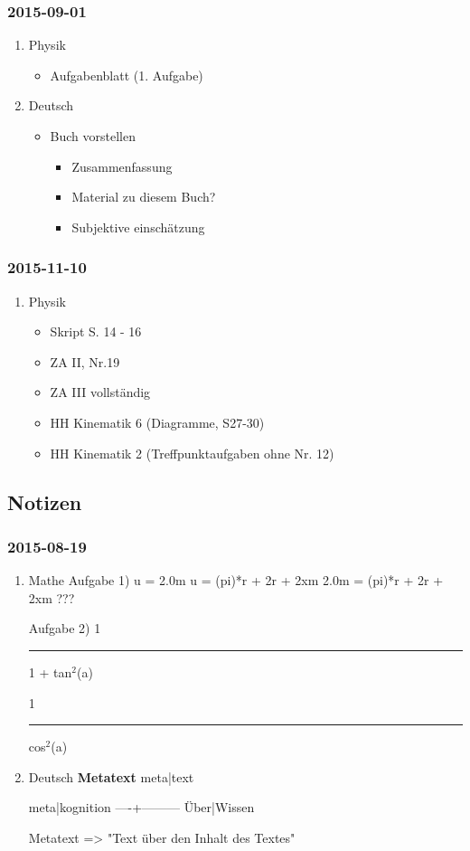 \documentclass[11pt]{article}
\begin{document}
\subsubsection{2015-09-01}
\label{sec-1-1-4}
\begin{enumerate}
\item Physik
\label{sec-1-1-4-1}
\begin{itemize}
\item Aufgabenblatt (1. Aufgabe)
\end{itemize}
\item Deutsch
\label{sec-1-1-4-2}
\begin{itemize}
\item Buch vorstellen
\begin{itemize}
\item Zusammenfassung
\item Material zu diesem Buch?
\item Subjektive einschätzung
\end{itemize}
\end{itemize}
\end{enumerate}
\subsubsection{2015-11-10}
\label{sec-1-1-5}
\begin{enumerate}
\item Physik
\label{sec-1-1-5-1}
\begin{itemize}
\item Skript S. 14 - 16
\item ZA II, Nr.19
\item ZA III vollständig
\item HH Kinematik 6 (Diagramme, S27-30)
\item HH Kinematik 2 (Treffpunktaufgaben ohne Nr. 12)
\end{itemize}
\end{enumerate}
\subsection{Notizen}
\label{sec-1-2}
\subsubsection{2015-08-19}
\label{sec-1-2-1}
\begin{enumerate}
\item Mathe
\label{sec-1-2-1-1}
Aufgabe 1)
u = 2.0m
u = (pi)*r + 2r + 2xm
2.0m = (pi)*r + 2r + 2xm
???

Aufgabe 2)
   1

\rule{\linewidth}{0.5pt}
1 + tan$^{\text{2}}$(a)


1

\rule{\linewidth}{0.5pt}
cos$^{\text{2}}$(a)

\item Deutsch
\label{sec-1-2-1-2}
\textbf{Metatext}
meta|text

meta|kognition
----+---------
Über|Wissen

Metatext => "Text über den Inhalt des Textes"
\end{enumerate}
\end{document}
